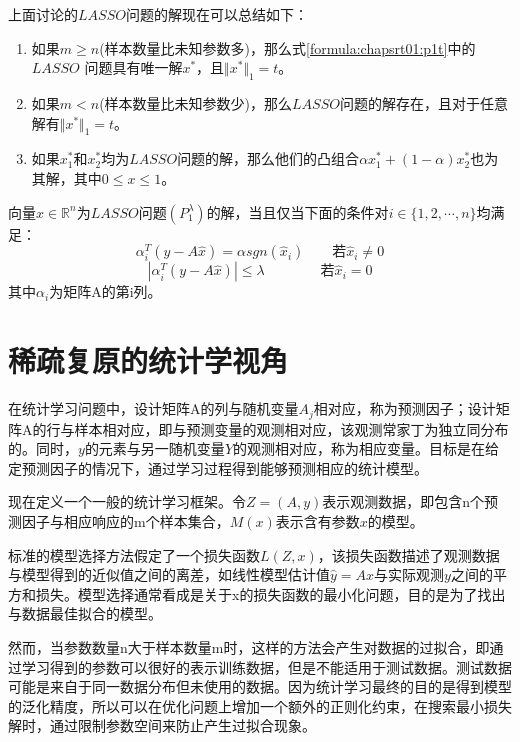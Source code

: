 上面讨论的$ LASSO $问题的解现在可以总结如下：
\begin{theorem}[Osborne et al., 2000b]\quad\par
\begin{enumerate}
	\item 如果$ m\geq n$(样本数量比未知参数多)，那么式\ref{formula:chapsrt01:p1t}中的$ LASSO$ 问题具有唯一解$ x^*$，且$ \Vert x^*\Vert_1 =t $。
	\item 如果$ m<n $(样本数量比未知参数少)，那么$ LASSO $问题的解存在，且对于任意解有$ \Vert x^*\Vert_1 =t $。
	\item 如果$ x_1^* $和$ x_2^* $均为$ LASSO $问题的解，那么他们的凸组合$\alpha x_1^* +(1-\alpha)x_2^* $也为其解，其中$ 0\leq x\leq 1 $。
\end{enumerate}
\end{theorem}

\begin{lemma}[最优性条件]
向量$ \hat{x}\in\mathbb{R}^n $为$ LASSO $问题$ (P_1^{\lambda}) $的解，当且仅当下面的条件对$ i\in \{1,2,\cdots,n\} $均满足：
\[ \alpha^T_i(y-A\hat{x}) = \alpha sgn(\hat{x}_i)\qquad \mbox{若}\hat{x}_i\neq 0\]
\[ |\alpha^T_i(y-A\hat{x})|\leq \lambda \qquad\qquad \mbox{若}\hat{x}_i= 0 \]
其中$ \alpha_i $为矩阵A的第i列。
\end{lemma}


\section{稀疏复原的统计学视角}

在统计学习问题中，设计矩阵A的列与随机变量$ A_j $相对应，称为预测因子；设计矩阵A的行与样本相对应，即与预测变量的观测相对应，该观测常家丁为独立同分布的。同时，$ y $的元素与另一随机变量$ Y $的观测相对应，称为相应变量。目标是在给定预测因子的情况下，通过学习过程得到能够预测相应的统计模型。

现在定义一个一般的统计学习框架。令$ Z=(A,y) $表示观测数据，即包含n个预测因子与相应响应的m个样本集合，$ M(x) $表示含有参数$ x $的模型。

标准的模型选择方法假定了一个损失函数$ L(Z,x) $，该损失函数描述了观测数据与模型得到的近似值之间的离差，如线性模型估计值$ \hat{y}=Ax $与实际观测$ y $之间的平方和损失。模型选择通常看成是关于x的损失函数的最小化问题，目的是为了找出与数据最佳拟合的模型。

然而，当参数数量n大于样本数量m时，这样的方法会产生对数据的过拟合，即通过学习得到的参数可以很好的表示训练数据，但是不能适用于测试数据。测试数据可能是来自于同一数据分布但未使用的数据。因为统计学习最终的目的是得到模型的泛化精度，所以可以在优化问题上增加一个额外的正则化约束，在搜索最小损失解时，通过限制参数空间来防止产生过拟合现象。

